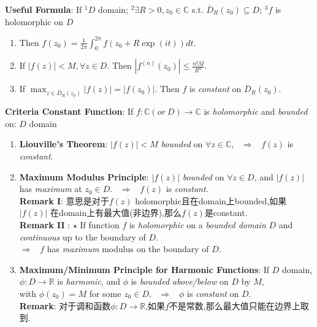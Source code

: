 \documentclass[9pt]{article}
\begin{document}
\textbf{Useful Formula}: If $^1D$ domain; $^2\exists R>0,z_0\in\mathbb{C}$ s.t. $\overline{D}_{R}(z_0)\subseteq D$; $^3f$ is holomorphic on $D$

\begin{enumerate}[itemsep=-2pt, topsep=-2pt]
    \item Then $f(z_0)=\frac{1}{2\pi}\int_0^{2\pi}f(z_0+R\exp(it))dt$.
    \item If $|f(z)|<M,\forall z\in D$. Then $|f^{(n)}(z_0)|\leq\frac{n!M}{R^n}$.
    \item If $\max_{{z\in}\overline{D}_{R}(z_0)}|f(z)|=|f(z_0)|$. Then $f$ is \textit{constant} on $\overline{D}_{R}(z_0)$.
\end{enumerate}

\textbf{Criteria Constant Function}: If $f:\mathbb{C}(or \ D)\to\mathbb{C}$ is \textit{holomorphic} and \textit{bounded} on: \qquad\qquad $D$ domain

\begin{enumerate}[itemsep=-2pt, topsep=-2pt]
    \item \textbf{Liouville's Theorem}: $|f(z)|<M$ \textit{bounded} on $\forall z \in \mathbb{C}$, \ $\Rightarrow$ \ $f(z)$ is \textit{constant}.
    \item \textbf{Maximum Modulus Principle}: $|f(z)|$ \textit{bounded} on $\forall z \in D$, and $|f(z)|$ has \textit{maximum} at $z_0\in D$. \ $\Rightarrow$ \ $f(z)$ is \textit{constant}. \\
    \textbf{Remark I}: {\footnotesize 意思是对于$f(z)$ holomorphic且在domain上bounded,如果 $|f(z)|$ 在domain上有最大值(非边界),那么$f(z)$是constant.} \\
    \textbf{Remark II} : $\star$ If function $f$ is \textit{holomorphic} on a \textit{bounded domain} $D$ and \textit{continuous} up to the boundary of $D$. \\
    $\Rightarrow$ \ $f$ has \textit{maximum} modulus on the boundary of $D$. 
    \item {\small \textbf{Maximum/Minimum Principle for Harmonic Functions}: If $D$ domain, $\phi:D\to\mathbb{R}$ is \textit{harmonic}, and $\phi$ is \textit{bounded above/below} on $D$ by $M$,} \\
    {\small with $\phi(z_0)=M$ for some $z_0\in D$.} \ $\Rightarrow$ \ $\phi$ is \textit{constant} on $D$. \\
    \textbf{Remark}: {\footnotesize 对于调和函数$\phi:D\to\mathbb{R}$,如果$f$不是常数,那么最大值只能在边界上取到.}
\end{enumerate}
\end{document}
